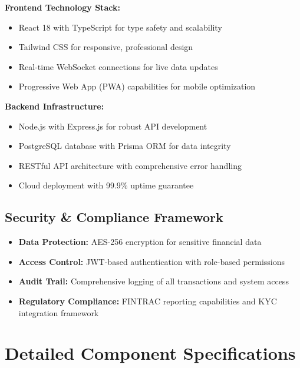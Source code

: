 \documentclass[11pt, letterpaper]{article}
\begin{document}
\begin{tcolorbox}[colback=lightGray, colframe=darkGray, title=\textbf{Modular System Architecture}]
\textbf{Frontend Technology Stack:}
\begin{itemize}[leftmargin=*]
    \item React 18 with TypeScript for type safety and scalability
    \item Tailwind CSS for responsive, professional design
    \item Real-time WebSocket connections for live data updates
    \item Progressive Web App (PWA) capabilities for mobile optimization
\end{itemize}

\textbf{Backend Infrastructure:}
\begin{itemize}[leftmargin=*]
    \item Node.js with Express.js for robust API development
    \item PostgreSQL database with Prisma ORM for data integrity
    \item RESTful API architecture with comprehensive error handling
    \item Cloud deployment with 99.9\% uptime guarantee
\end{itemize}
\end{tcolorbox}

\subsection{Security \& Compliance Framework}

\begin{itemize}[leftmargin=*]
    \item \textbf{Data Protection:} AES-256 encryption for sensitive financial data
    \item \textbf{Access Control:} JWT-based authentication with role-based permissions
    \item \textbf{Audit Trail:} Comprehensive logging of all transactions and system access
    \item \textbf{Regulatory Compliance:} FINTRAC reporting capabilities and KYC integration framework
\end{itemize}

\section{Detailed Component Specifications}
\end{document}
